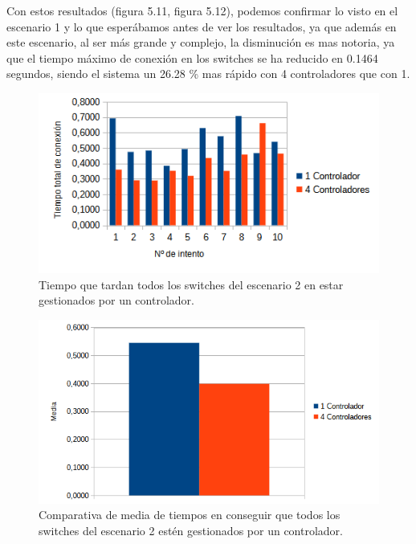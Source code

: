 \documentclass[a4paper, 12pt]{book}
\begin{document}
 	Con estos resultados (figura 5.11, figura 5.12), podemos confirmar lo visto en el escenario 1 y lo que esperábamos antes de ver los resultados, ya que además en este escenario, al ser más grande y complejo, la disminución es mas notoria, ya que el tiempo máximo de conexión en los switches se ha reducido en 0.1464 segundos, siendo el sistema un 26.28 \% mas rápido con 4 controladores que con 1.
 	
 	\begin{figure}[H]
 		\centering
 		\includegraphics[width=16cm, keepaspectratio]{img/comparativamesh}
 		\caption{Tiempo que tardan todos los switches del escenario 2 en estar gestionados por un controlador.}
 		\label{figura:comparativamesh}
 	\end{figure}
 	
 	
 	\begin{figure}[H]
 		\centering
 		\includegraphics[width=12cm, keepaspectratio]{img/comparativamediamesh}
 		\caption{Comparativa de media de tiempos en conseguir que todos los switches del escenario 2 estén gestionados por un controlador.}
 		\label{figura:mediamesh}
 	\end{figure}
 	
\end{document}
